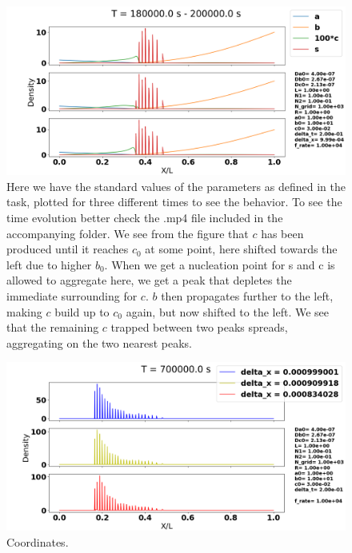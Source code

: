 \documentclass[1p]{elsarticle}        	%
\begin{document}
\begin{figure}[h]
	\centering
	\includegraphics[width=\linewidth]{../figures/standard_settings_time.png}
	\caption{Here we have the standard values of the parameters as defined in the task, plotted for three different times to see the behavior. To see the time evolution better check the .mp4 file included in the accompanying folder. We see from the figure that $c$ has been produced until it reaches $c_0$ at some point, here shifted towards the left due to higher $b_0$. When we get a nucleation point for s and c is allowed to aggregate here, we get a peak that depletes the immediate surrounding for $c$. $b$ then propagates further to the left, making $c$ build up to $c_0$ again, but now shifted to the left. We see that the  remaining $c$ trapped between two peaks spreads, aggregating on the two nearest peaks.}
	\label{fig:coords}
\end{figure}

\begin{figure}
	\centering
	\includegraphics[width=\linewidth]{../figures/deltaX.png}
	\caption{Coordinates.}
	\label{fig:coords}
\end{figure}
\end{document}
